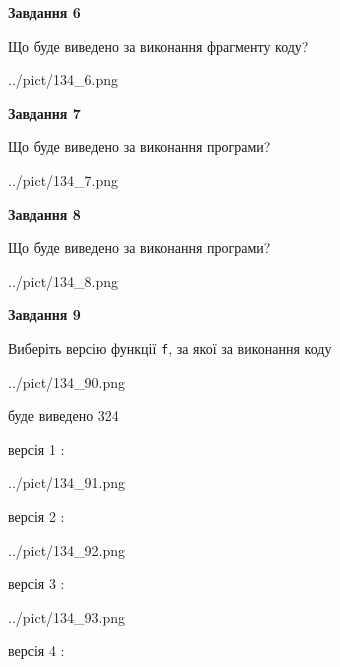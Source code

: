 \documentclass[12pt, ukrainian]{article}
\def\code#1{\Verb!#1!}
\begin{document}
{\begin {large}
{\begin {center}\textbf{Завдання 6}\end {center}}

Що буде виведено за виконання фрагменту коду?\par
\begin{center}
	{../pict/134_6.png}
\end{center}
\newpage

{\begin {center}\textbf{Завдання 7}\end {center}}

Що буде виведено за виконання програми?\par
\begin{center}
	{../pict/134_7.png}
\end{center}
\newpage

{\begin {center}\textbf{Завдання 8}\end {center}}

Що буде виведено за виконання програми?\par
\begin{center}
	{../pict/134_8.png}
\end{center}
\newpage

{\begin {center}\textbf{Завдання 9}\end {center}}

Виберіть версію функції \code{f}, за якої за виконання коду
\begin{center}
	{../pict/134_90.png}
\end{center}
буде виведено 324

\vspace{5mm}
версія 1 :

\begin{center}
	{../pict/134_91.png}
\end{center}
версія 2 :

\begin{center}
	{../pict/134_92.png}
\end{center}
версія 3 :

\begin{center}
	{../pict/134_93.png}
\end{center}
версія 4 :


\end{large}}
\end{document}
